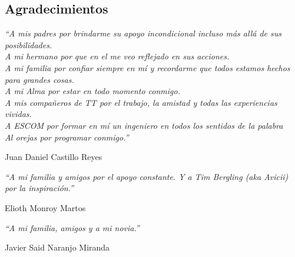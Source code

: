 
\begin{comment}
\begin{acknowledgements}

También quisiera reconocer a ... por ...CONACYT,  PAPIIT / etc.
\end{acknowledgements}
\end{comment}

\begin{alwayssingle}
	{
		\pagestyle{empty}
		\vspace{1.5cm}
		{\chapter*{Agradecimientos}
			\noindent 
			\textit{``A mis padres por brindarme su apoyo incondicional incluso más allá de sus posibilidades.\\
			A mi hermano por que en el me veo reflejado en sus acciones.\\
			A mi familia por confiar siempre en mí y recordarme que todos estamos hechos para grandes cosas.\\
			A mi Alma por estar en todo momento conmigo.\\
			A mis compañeros de TT por el trabajo, la amistad y todas las experiencias vividas.\\
			A ESCOM por formar en mí un ingeniero en todos los sentidos de la palabra\\
			Al orejas por programar conmigo.''}
			\begin{flushright}
				Juan Daniel Castillo Reyes
			\end{flushright}
			\noindent 
			\textit{``A mi familia y amigos por el apoyo constante. Y a Tim Bergling (aka Avicii) por la inspiración.''}
			\begin{flushright}
				Elioth Monroy Martos
			\end{flushright}
			\noindent 
			\textit{``A mi familia, amigos y a mi novia.''}
			\begin{flushright}
				Javier Said Naranjo Miranda
			\end{flushright}
			
		}
	}
	
\end{alwayssingle}



